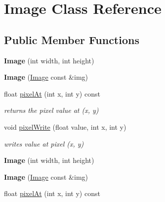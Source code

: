\hypertarget{class_image}{\section{Image Class Reference}
\label{class_image}
}
\subsection*{Public Member Functions}
\begin{DoxyCompactItemize}
\item 
\hypertarget{class_image_afb0339b802ed560e69eb07358d30198f}{{\bfseries Image} (int width, int height)}\label{class_image_afb0339b802ed560e69eb07358d30198f}

\item 
\hypertarget{class_image_a11c4da10d93cb19f684f5dbec08e564d}{{\bfseries Image} (\hyperlink{class_image}{Image} const \&img)}\label{class_image_a11c4da10d93cb19f684f5dbec08e564d}

\item 
\hypertarget{class_image_a9b183ad498d8ffea3f91a21e5a67920d}{float \hyperlink{class_image_a9b183ad498d8ffea3f91a21e5a67920d}{pixel\-At} (int x, int y) const }\label{class_image_a9b183ad498d8ffea3f91a21e5a67920d}

\begin{DoxyCompactList}\small\item\em returns the pixel value at (x, y) \end{DoxyCompactList}\item 
\hypertarget{class_image_afcd6f049060759d996f08b335ef2351d}{void \hyperlink{class_image_afcd6f049060759d996f08b335ef2351d}{pixel\-Write} (float value, int x, int y)}\label{class_image_afcd6f049060759d996f08b335ef2351d}

\begin{DoxyCompactList}\small\item\em writes value at pixel (x, y) \end{DoxyCompactList}\item 
\hypertarget{class_image_afb0339b802ed560e69eb07358d30198f}{{\bfseries Image} (int width, int height)}\label{class_image_afb0339b802ed560e69eb07358d30198f}

\item 
\hypertarget{class_image_a11c4da10d93cb19f684f5dbec08e564d}{{\bfseries Image} (\hyperlink{class_image}{Image} const \&img)}\label{class_image_a11c4da10d93cb19f684f5dbec08e564d}

\item 
\hypertarget{class_image_a9b183ad498d8ffea3f91a21e5a67920d}{float \hyperlink{class_image_a9b183ad498d8ffea3f91a21e5a67920d}{pixel\-At} (int x, int y) const }\label{class_image_a9b183ad498d8ffea3f91a21e5a67920d}


\end{DoxyCompactItemize}
